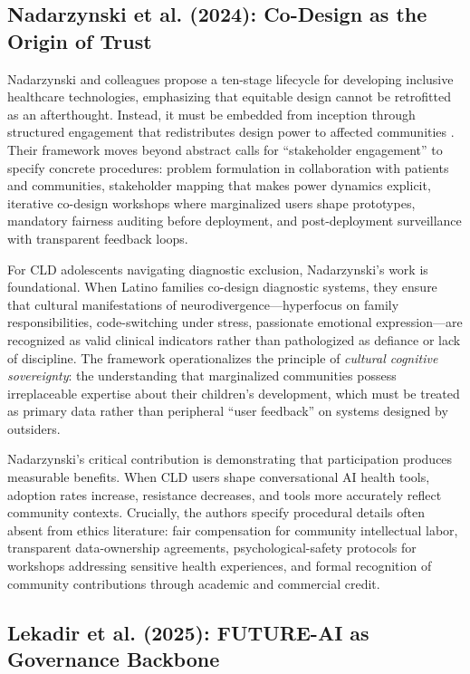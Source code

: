 \documentclass[12pt,a4paper]{article}
\begin{document}
\subsection{Nadarzynski et al. (2024): Co-Design as the Origin of Trust}

Nadarzynski and colleagues propose a ten-stage lifecycle for developing inclusive healthcare technologies, emphasizing that equitable design cannot be retrofitted as an afterthought. Instead, it must be embedded from inception through structured engagement that redistributes design power to affected communities \citep{Nadarzynski2024}. Their framework moves beyond abstract calls for ``stakeholder engagement'' to specify concrete procedures: problem formulation in collaboration with patients and communities, stakeholder mapping that makes power dynamics explicit, iterative co-design workshops where marginalized users shape prototypes, mandatory fairness auditing before deployment, and post-deployment surveillance with transparent feedback loops.

For CLD adolescents navigating diagnostic exclusion, Nadarzynski's work is foundational. When Latino families co-design diagnostic systems, they ensure that cultural manifestations of neurodivergence—hyperfocus on family responsibilities, code-switching under stress, passionate emotional expression—are recognized as valid clinical indicators rather than pathologized as defiance or lack of discipline. The framework operationalizes the principle of \textit{cultural cognitive sovereignty}: the understanding that marginalized communities possess irreplaceable expertise about their children's development, which must be treated as primary data rather than peripheral ``user feedback'' on systems designed by outsiders.

Nadarzynski's critical contribution is demonstrating that participation produces measurable benefits. When CLD users shape conversational AI health tools, adoption rates increase, resistance decreases, and tools more accurately reflect community contexts. Crucially, the authors specify procedural details often absent from ethics literature: fair compensation for community intellectual labor, transparent data-ownership agreements, psychological-safety protocols for workshops addressing sensitive health experiences, and formal recognition of community contributions through academic and commercial credit.

\subsection{Lekadir et al. (2025): FUTURE-AI as Governance Backbone}
\end{document}
